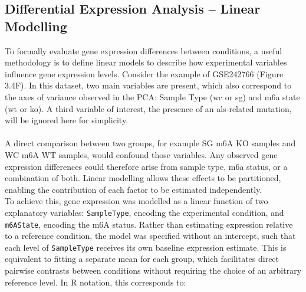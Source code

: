 
\subsection{Differential Expression Analysis – Linear Modelling}

To formally evaluate gene expression differences between conditions, a useful methodology is to define linear models to describe how experimental variables influence gene expression levels. Consider the example of GSE242766\cite{di_timoteo_m6a_2024} (Figure 3.4F). In this dataset, two main variables are present, which also correspond to the axes of variance observed in the PCA: Sample Type (\gls{wc} or \gls{sg}) and \gls{m6a} state (\gls{wt} or \gls{ko}). A third variable of interest, the presence of an \gls{als}-related mutation, will be ignored here for simplicity.
\\
\\
A direct comparison between two groups, for example SG m6A KO samples and WC m6A WT samples, would confound those variables. Any observed gene expression differences could therefore arise from sample type, \gls{m6a} status, or a combination of both. Linear modelling allows these effects to be partitioned, enabling the contribution of each factor to be estimated independently.
\\
\linebreak
\noindent
To achieve this, gene expression was modelled as a linear function of two explanatory variables: \texttt{SampleType}, encoding the experimental condition, and \texttt{m6AState}, encoding the m6A status. Rather than estimating expression relative to a reference condition, the model was specified without an intercept, such that each level of \texttt{SampleType} receives its own baseline expression estimate. This is equivalent to fitting a separate mean for each group, which facilitates direct pairwise contrasts between conditions without requiring the choice of an arbitrary reference level. In R notation, this corresponds to: 
